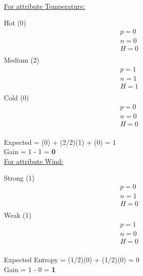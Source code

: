 \documentclass[8pt, fullpage,letterpaper]{article}
\begin{document}
\begin{enumerate}
\begin{enumerate}
\begin{enumerate}
\begin{enumerate}
\begin{itemize}
						\underline {For attribute Temperature:} 
							\vspace{-5pt}
							\begin{multicols}{3}
								Hot (0)
			 						\begin{align*}
									    	& p = 0\\
										& n = 0 \\
									    	& H = 0\\
								      \end{align*}
								Medium (2)
			 						\begin{align*}
									    	& p = 1\\
										& n = 1 \\
									    	& H = 1\\
								      \end{align*}
								Cold (0)
			 						\begin{align*}
									    	& p = 0\\
										& n = 0 \\
									    	& H = 0\\
								      \end{align*}
							\end{multicols}
							\vspace{-20pt}
							Expected = (0) + (2/2)(1) + (0) = 1\\
							Gain = 1 - 1 = {\bf 0}\\


						\underline {For attribute Wind:} 
							\vspace{-5pt}
							\begin{multicols}{2}
								Strong (1)
			 						\begin{align*}
									    	& p = 0\\
										& n = 1 \\
									    	& H = 0\\
								      \end{align*}
								Weak (1)
			 						\begin{align*}
									    	& p = 1\\
										& n = 0 \\
									    	& H = 0\\
								      \end{align*}
							\end{multicols}
							\vspace{-20pt}
							Expected Entropy = (1/2)(0) + (1/2)(0) = 0\\
							Gain = 1 - 0 = {\bf 1}\\


\end{itemize}
\end{enumerate}
\end{enumerate}
\end{enumerate}
\end{enumerate}
\end{document}
